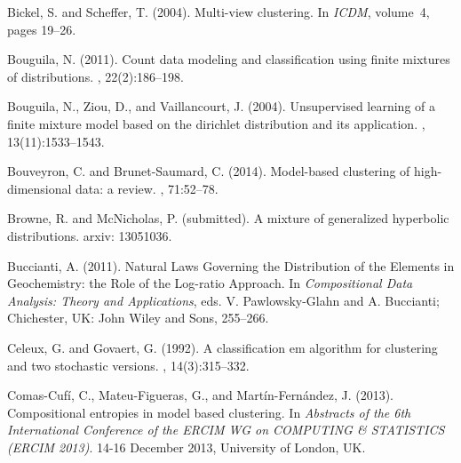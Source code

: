 \documentclass[10pt, a4paper]{article}
\begin{document}
\begin{thebibliography}{00}
Bickel, S. and Scheffer, T. (2004).
\newblock Multi-view clustering.
\newblock In {\em ICDM}, volume~4, pages 19--26.


Bouguila, N. (2011).
\newblock Count data modeling and classification using finite mixtures of
  distributions.
, 22(2):186--198.

Bouguila, N., Ziou, D., and Vaillancourt, J. (2004).
\newblock Unsupervised learning of a finite mixture model based on the
  dirichlet distribution and its application.
, 13(11):1533--1543.

Bouveyron, C. and Brunet-Saumard, C. (2014).
\newblock Model-based clustering of high-dimensional data: a review.
, 71:52--78.

Browne, R. and McNicholas, P. (submitted).
\newblock A mixture of generalized hyperbolic distributions. arxiv: 13051036.

Buccianti, A. (2011). 
\newblock Natural Laws Governing the Distribution of the Elements in Geochemistry: the Role of the Log-ratio Approach.
\newblock In {\em Compositional Data Analysis: Theory
and Applications}, eds. V. Pawlowsky-Glahn and A. Buccianti; Chichester, UK: John Wiley and Sons, 255--266.

Celeux, G. and Govaert, G. (1992).
\newblock A classification em algorithm for clustering and two stochastic
  versions.
, 14(3):315--332.

Comas-Cuf\'i, C., Mateu-Figueras, G., and Mart\'in-Fern\'andez, J. (2013).
\newblock Compositional entropies in model based clustering.
\newblock In {\em Abstracts of the 6th International Conference of the ERCIM WG
  on COMPUTING \& STATISTICS (ERCIM 2013)}. 14-16 December 2013, University of
  London, UK.


\end{thebibliography}
\end{document}
